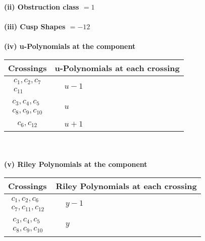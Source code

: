 \documentclass[1p]{elsarticle_modified}
\theoremstyle{definition}
\begin{document}
\flushleft \textbf{(ii) Obstruction class $= 1$}\\~\\
\flushleft \textbf{(iii) Cusp Shapes $= -12$}\\~\\
\newpage\renewcommand{\arraystretch}{1}
\flushleft \textbf{(iv) u-Polynomials at the component}\newline \\
\begin{tabular}{m{50pt}|m{274pt}}
Crossings & \hspace{64pt}u-Polynomials at each crossing \\
\hline $$\begin{aligned}c_{1},c_{2},c_{7}\\c_{11}\end{aligned}$$&$\begin{aligned}
&u-1
\end{aligned}$\\
\hline $$\begin{aligned}c_{3},c_{4},c_{5}\\c_{8},c_{9},c_{10}\end{aligned}$$&$\begin{aligned}
&u
\end{aligned}$\\
\hline $$\begin{aligned}c_{6},c_{12}\end{aligned}$$&$\begin{aligned}
&u+1
\end{aligned}$\\
\hline
\end{tabular}\\~\\
\newpage\renewcommand{\arraystretch}{1}
\flushleft \textbf{(v) Riley Polynomials at the component}\newline \\
\begin{tabular}{m{50pt}|m{274pt}}
Crossings & \hspace{64pt}Riley Polynomials at each crossing \\
\hline $$\begin{aligned}c_{1},c_{2},c_{6}\\c_{7},c_{11},c_{12}\end{aligned}$$&$\begin{aligned}
&y-1
\end{aligned}$\\
\hline $$\begin{aligned}c_{3},c_{4},c_{5}\\c_{8},c_{9},c_{10}\end{aligned}$$&$\begin{aligned}
&y
\end{aligned}$\\
\hline
\end{tabular}\\~\\
\end{document}
